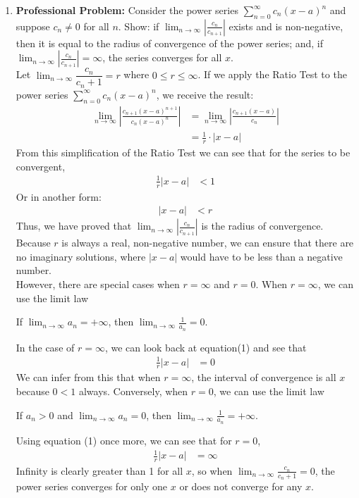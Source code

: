 \documentclass{article}
\begin{document}
\begin{enumerate}[label=\textbf{(13.\arabic*)}]
\item \textbf{Professional Problem:} Consider the power series $\displaystyle \sum_{n=0}^\infty c_n(x-a)^n$ and suppose $c_n\neq0$ for all $n$. Show: if $\displaystyle \lim_{n\to\infty} \left|\frac{c_n}{c_{n+1}}\right|$ exists and is non-negative, then it is equal to the radius of convergence of the power series; and, if $\displaystyle \lim_{n\to\infty} \left|\frac{c_n}{c_{n+1}}\right|=\infty$, the series converges for all $x$. \\
\newline
Let $\displaystyle \lim_{n\to\infty} \dfrac{c_n}{c_n+1}=r$ where $0\le r\le \infty$. If we apply the Ratio Test to the power series $\displaystyle \sum_{n=0}^\infty c_n(x-a)^n$, we receive the result:
\begin{align*}
\lim_{n\to\infty} \left|\frac{c_{n+1}(x-a)^{n+1}}{c_n(x-a)^n}\right| &= \lim_{n\to\infty} \left|\frac{c_{n+1}(x-a)}{c_n}\right|\\
&= \frac{1}{r}\cdot|x-a|
\end{align*}
From this simplification of the Ratio Test we can see that for the series to be convergent,
\begin{align}
\frac{1}{r}|x-a| &< 1
\end{align}
Or in another form:
\begin{align*}
|x-a| &< r
\end{align*}
Thus, we have proved that $\displaystyle \lim_{n\to\infty} \left|\frac{c_n}{c_{n+1}}\right|$ is the radius of convergence. Because $r$ is always a real, non-negative number, we can ensure that there are no imaginary solutions, where $|x-a|$ would have to be less than a negative number. \\
However, there are special cases when $r=\infty$ and $r=0$. When $r=\infty$, we can use the limit law
\begin{center}
If $\displaystyle \lim_{n\to\infty} a_n=+\infty$, then $\displaystyle \lim_{n\to\infty} \frac{1}{a_n}=0$.
\end{center}
In the case of $r=\infty$, we can look back at equation(1) and see that
\begin{align*}
\frac{1}{r}|x-a| &= 0
\end{align*}
We can infer from this that when $r=\infty$, the interval of convergence is all $x$ because $0<1$ always. Conversely, when $r=0$, we can use the limit law
\begin{center}
If $a_n>0$ and $\lim_{n\to\infty} a_n=0$, then $\lim_{n\to\infty} \frac{1}{a_n}=+\infty$.
\end{center}
Using equation (1) once more, we can see that for $r=0$,
\begin{align*}
\frac{1}{r}|x-a| &= \infty
\end{align*}
Infinity is clearly greater than 1 for all $x$, so when $\displaystyle \lim_{n\to\infty} \frac{c_n}{c_n+1}=0$, the power series converges for only one $x$ or does not converge for any $x$.

\end{enumerate}
\end{document}
